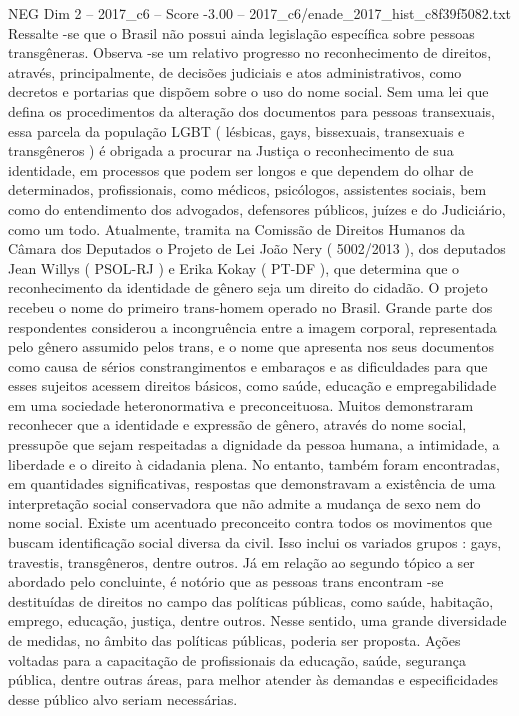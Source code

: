\begin{textsample}{NEG Dim 2 – 2017\_c6 – Score -3.00 – 2017\_c6/enade\_2017\_hist\_c8f39f5082.txt}
Ressalte -se que o Brasil não possui ainda legislação específica sobre pessoas transgêneras.
Observa -se um relativo progresso no reconhecimento de direitos, através, principalmente, de decisões judiciais e atos administrativos, como decretos e portarias que dispõem sobre o uso do nome social.
Sem uma lei que defina os procedimentos da alteração dos documentos para pessoas transexuais, essa parcela da população LGBT ( lésbicas, gays, bissexuais, transexuais e transgêneros ) é obrigada a procurar na Justiça o reconhecimento de sua identidade, em processos que podem ser longos e que dependem do olhar de determinados, profissionais, como médicos, psicólogos, assistentes sociais, bem como do entendimento dos advogados, defensores públicos, juízes e do Judiciário, como um todo.
Atualmente, tramita na Comissão de Direitos Humanos da Câmara dos Deputados o Projeto de Lei João Nery ( 5002/2013 ), dos deputados Jean Willys ( PSOL-RJ ) e Erika Kokay ( PT-DF ), que determina que o reconhecimento da identidade de gênero seja um direito do cidadão.
O projeto recebeu o nome do primeiro trans-homem operado no Brasil.
Grande parte dos respondentes considerou a incongruência entre a imagem corporal, representada pelo gênero assumido pelos trans, e o nome que apresenta nos seus documentos como causa de sérios constrangimentos e embaraços e as dificuldades para que esses sujeitos acessem direitos básicos, como saúde, educação e empregabilidade em uma sociedade heteronormativa e preconceituosa.
Muitos demonstraram reconhecer que a identidade e expressão de gênero, através do nome social, pressupõe que sejam respeitadas a dignidade da pessoa humana, a intimidade, a liberdade e o direito à cidadania plena.
No entanto, também foram encontradas, em quantidades significativas, respostas que demonstravam a existência de uma interpretação social conservadora que não admite a mudança de sexo nem do nome social.
Existe um acentuado preconceito contra todos os movimentos que buscam identificação social diversa da civil.
Isso inclui os variados grupos : gays, travestis, transgêneros, dentre outros.
Já em relação ao segundo tópico a ser abordado pelo concluinte, é notório que as pessoas trans encontram -se destituídas de direitos no campo das políticas públicas, como saúde, habitação, emprego, educação, justiça, dentre outros.
Nesse sentido, uma grande diversidade de medidas, no âmbito das políticas públicas, poderia ser proposta.
Ações voltadas para a capacitação de profissionais da educação, saúde, segurança pública, dentre outras áreas, para melhor atender às demandas e especificidades desse público alvo seriam necessárias.

\end{textsample}
